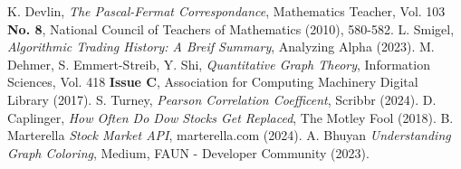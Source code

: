 \documentclass{article}
\begin{document}

\begin{thebibliography}{99}
    K. Devlin, \emph{The Pascal-Fermat Correspondance}, Mathematics Teacher, Vol. 103 \textbf{No. 8}, National Council of Teachers of Mathematics (2010), 580-582.
    L. Smigel, \emph{Algorithmic Trading History: A Breif Summary}, Analyzing Alpha (2023).
    M. Dehmer, S. Emmert-Streib, Y. Shi, \emph{Quantitative Graph Theory}, Information Sciences, Vol. 418 \textbf{Issue C}, Association for Computing Machinery Digital Library (2017).
    S. Turney, \emph{Pearson Correlation Coefficent}, Scribbr (2024).
    D. Caplinger, \emph{How Often Do Dow Stocks Get Replaced}, The Motley Fool (2018).
    B. Marterella \emph{Stock Market API}, marterella.com (2024).
    A. Bhuyan \emph{Understanding Graph Coloring}, Medium, FAUN - Developer Community (2023).
\end{thebibliography}

\clearpage
\end{document}
